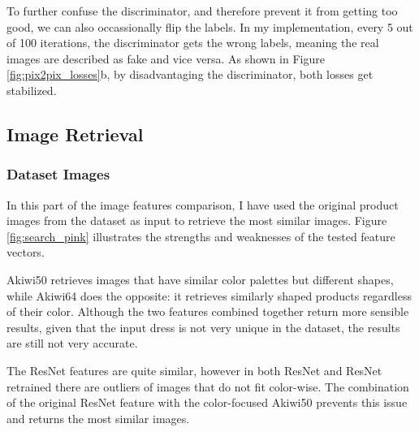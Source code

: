 \documentclass{article}
\begin{document}
To further confuse the discriminator, and therefore prevent it from getting too good, we can also occassionally flip the labels. In my implementation, every 5 out of 100 iterations, the discriminator gets the wrong labels, meaning the real images are described as fake and vice versa. As shown in Figure \ref{fig:pix2pix_losses}b, by disadvantaging the discriminator, both losses get stabilized.




\pagebreak
\subsection{Image Retrieval}

\subsubsection{Dataset Images}
In this part of the image features comparison, I have used the original product images from the dataset as input to retrieve the most similar images. Figure \ref{fig:search_pink} illustrates the strengths and weaknesses of the tested feature vectors. 

Akiwi50 retrieves images that have similar color palettes but different shapes, while Akiwi64 does the opposite: it retrieves similarly shaped products regardless of their color. Although the two features combined together return more sensible results, given that the input dress is not very unique in the dataset, the results are still not very accurate. 

The ResNet features are quite similar, however in both ResNet and ResNet retrained there are outliers of images that do not fit color-wise. The combination of the original ResNet feature with the color-focused Akiwi50 prevents this issue and returns the most similar images. 

\end{document}
